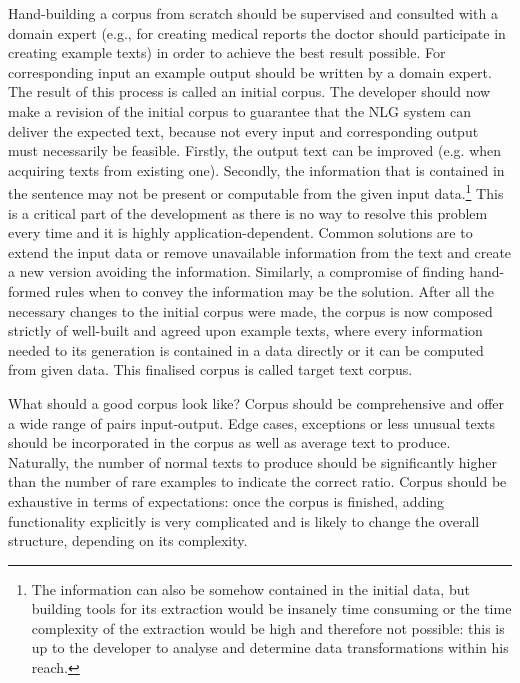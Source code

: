 Hand-building a corpus from scratch should be supervised and consulted with a domain expert (e.g., for creating medical reports the doctor should participate in creating example texts) in order to achieve the best result possible. For corresponding input an example output should be written by a domain expert. The result of this process is called an initial corpus. The developer should now make a revision of the initial corpus to guarantee that the NLG system can deliver the expected text, because not every input and corresponding output must necessarily be feasible. Firstly, the output text can be improved (e.g. when acquiring texts from existing one). Secondly, the information that is contained in the sentence may not be present or computable from the given input data.\footnote{The information can also be somehow contained in the initial data, but building tools for its extraction would be insanely time consuming or the time complexity of the extraction would be high and therefore not possible: this is up to the developer to analyse and determine data transformations within his reach.} This is a critical part of the development as there is no way to resolve this problem every time and it is highly application-dependent. Common solutions are to extend the input data or remove unavailable information from the text and create a new version avoiding the information. Similarly, a compromise of finding hand-formed rules when to convey the information may be the solution. After all the necessary changes to the initial corpus were made, the corpus is now composed strictly of well-built and agreed upon example texts, where every information needed to its generation is contained in a data directly or it can be computed from given data. This finalised corpus is called target text corpus.

What should a good corpus look like? Corpus should be comprehensive and offer a wide range of pairs input-output. Edge cases, exceptions or less unusual texts should be incorporated in the corpus as well as average text to produce. Naturally, the number of normal texts to produce should be significantly higher than the number of rare examples to indicate the correct ratio. Corpus should be exhaustive in terms of expectations: once the corpus is finished, adding functionality explicitly is very complicated and is likely to change the overall structure, depending on its complexity. 

